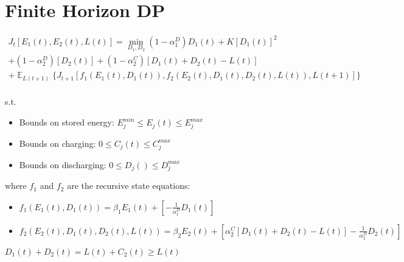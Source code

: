 \documentclass{article}
\DeclareMathOperator{\E}{\mathbb{E}}
\begin{document}
	\section{Finite Horizon DP}
	\begin{multline}
	J_{t}[E_{1}(t),E_{2}(t),L(t)] = \min_{D_{1},D_{2}}
	(1-\alpha_{1}^{D})D_{1}(t) 
	+ K[D_{1}(t)]^{2}\\
	+(1-\alpha_{2}^{D})[D_{2}(t)]	  +(1-\alpha_{2}^{C})[D_{1}(t)+D_{2}(t)-L(t)]\\
	+\mathop{\E}_{L(t+1)}\{J_{t+1}[f_{1}(E_{1}(t),D_{1}(t)), f_{2}(E_{2}(t),D_{1}(t),D_{2}(t),L(t)), L(t+1)]\}
	\end{multline}
	\\
	s.t. 
	\begin{itemize}
		\item Bounds on stored energy: 
		\begin{math}E_{j}^{min}\leq E_{j}(t)\leq E_{j}^{max}\end{math}
		\item Bounds on charging:
		\begin{math}0\leq C_{j}(t)\leq C_{j}^{max}\end{math}
		\item Bounds on discharging:
		\begin{math}0\leq D_{j}()\leq D_{j}^{max}\end{math}
	\end{itemize}
	where $f_{1}$ and $f_{2}$ are the recursive state equations:\\
	\begin{itemize}
		\item \begin{math}f_{1}(E_{1}(t),D_{1}(t))=\beta_{1}E_{1}(t)+\left[-\frac{1}{\alpha_{1}^{D}}D_{1}(t)\right]\end{math}\\
		\item \begin{math}f_{2}(E_{2}(t),D_{1}(t),D_{2}(t),L(t))=\beta_{2}E_{2}(t)+\left[\alpha_{2}^{C}[D_{1}(t)+D_{2}(t)-L(t)]-\frac{1}{\alpha_{2}^{D}}D_{2}(t)\right]\end{math}
	\end{itemize}


	\begin{math} D_{1}(t) + D_{2}(t) = L(t) + C_{2}(t) \geq L(t) \end{math}
	
\end{document}
